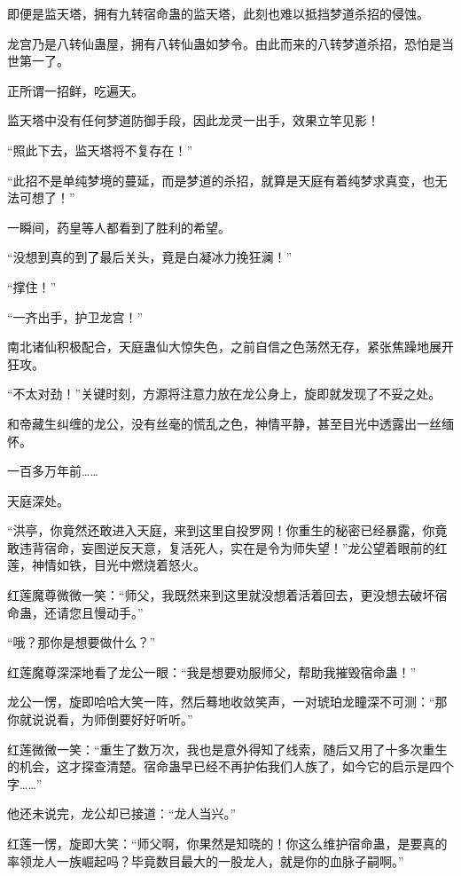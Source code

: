 
\begin{this_body}



即便是监天塔，拥有九转宿命蛊的监天塔，此刻也难以抵挡梦道杀招的侵蚀。

龙宫乃是八转仙蛊屋，拥有八转仙蛊如梦令。由此而来的八转梦道杀招，恐怕是当世第一了。

正所谓一招鲜，吃遍天。

监天塔中没有任何梦道防御手段，因此龙灵一出手，效果立竿见影！

“照此下去，监天塔将不复存在！”

“此招不是单纯梦境的蔓延，而是梦道的杀招，就算是天庭有着纯梦求真变，也无法可想了！”

一瞬间，药皇等人都看到了胜利的希望。

“没想到真的到了最后关头，竟是白凝冰力挽狂澜！”

“撑住！”

“一齐出手，护卫龙宫！”

南北诸仙积极配合，天庭蛊仙大惊失色，之前自信之色荡然无存，紧张焦躁地展开狂攻。

“不太对劲！”关键时刻，方源将注意力放在龙公身上，旋即就发现了不妥之处。

和帝藏生纠缠的龙公，没有丝毫的慌乱之色，神情平静，甚至目光中透露出一丝缅怀。

一百多万年前……

天庭深处。

“洪亭，你竟然还敢进入天庭，来到这里自投罗网！你重生的秘密已经暴露，你竟敢违背宿命，妄图逆反天意，复活死人，实在是令为师失望！”龙公望着眼前的红莲，神情如铁，目光中燃烧着怒火。

红莲魔尊微微一笑：“师父，我既然来到这里就没想着活着回去，更没想去破坏宿命蛊，还请您且慢动手。”

“哦？那你是想要做什么？”

红莲魔尊深深地看了龙公一眼：“我是想要劝服师父，帮助我摧毁宿命蛊！”

龙公一愣，旋即哈哈大笑一阵，然后蓦地收敛笑声，一对琥珀龙瞳深不可测：“那你就说说看，为师倒要好好听听。”

红莲微微一笑：“重生了数万次，我也是意外得知了线索，随后又用了十多次重生的机会，这才探查清楚。宿命蛊早已经不再护佑我们人族了，如今它的启示是四个字……”

他还未说完，龙公却已接道：“龙人当兴。”

红莲一愣，旋即大笑：“师父啊，你果然是知晓的！你这么维护宿命蛊，是要真的率领龙人一族崛起吗？毕竟数目最大的一股龙人，就是你的血脉子嗣啊。”


\end{this_body}
